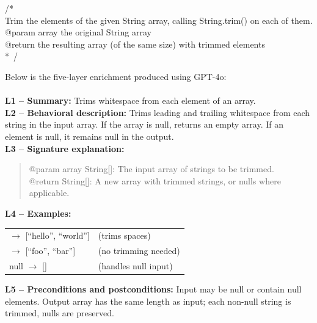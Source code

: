 \documentclass[a4paper]{usiinfbachelorproject}
\begin{document}
\begin{flushleft}
\ttfamily
\small
/\** \\
Trim the elements of the given String array, calling String.trim() on each of them.\\
@param array the original String array\\
@return the resulting array (of the same size) with trimmed elements\\
*\ /
\end{flushleft}
Below is the five-layer enrichment produced using GPT-4o:\\
\\[2pt]
\textbf{L1 – Summary:} Trims whitespace from each element of an array.\\[2pt]
\textbf{L2 – Behavioral description:} Trims leading and trailing whitespace from each string in the input array. If the array is null, returns an empty array. If an element is null, it remains null in the output.\\[2pt]
\textbf{L3 – Signature explanation:}
\begin{quote}\ttfamily
@param array String[]: The input array of strings to be trimmed.\\
@return String[]: A new array with trimmed strings, or nulls where applicable.
\end{quote}
\textbf{L4 – Examples:}

\begin{center}
\renewcommand{\arraystretch}{1.1}
\begin{tabular}{@{}l@{\hskip 1em}l@{}}
 $\rightarrow$ [``hello'', ``world''] & (trims spaces) \\
 $\rightarrow$ [``foo'', ``bar''] & (no trimming needed) \\
\ttfamily null $\rightarrow$ [] & (handles null input)
\end{tabular}
\end{center}
\textbf{L5 – Preconditions and postconditions:} Input may be null or contain null elements. Output array has the same length as input; each non-null string is trimmed, nulls are preserved.
\end{document}
